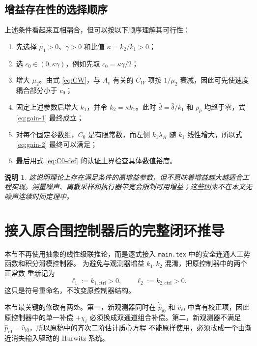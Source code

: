 \documentclass[UTF8,a4paper,12pt]{ctexart}
\newtheorem{remark}{说明}
\begin{document}
\subsection{增益存在性的选择顺序}

上述条件看起来互相耦合，但可以按以下顺序理解其可行性：
\begin{enumerate}
  \item 先选择 $\mu_1>0$、$\gamma>0$ 和比值 $\kappa=k_2/k_1>0$；
  \item 选 $c_0\in(0,\kappa\gamma)$，例如先取 $c_0=\kappa\gamma/2$；
  \item 增大 $\mu_2$。由式 \eqref{eq:CW}，与 $A_v$ 有关的 $C_W$ 项按 $1/\mu_2$ 衰减，因此可先使速度耦合部分小于 $c_0$；
  \item 固定上述参数后增大 $k_1$，并令 $k_2=\kappa k_1$。此时 $\bar d=\bar\delta/k_1$ 和 $\rho_p$ 均趋于零，式 \eqref{eq:gain-1} 最终成立；
  \item 对每个固定参数组，$C_0$ 是有限常数，而左侧 $k_1\lambda_H$ 随 $k_1$ 线性增大，所以式 \eqref{eq:gain-2} 最终可以满足；
  \item 最后用式 \eqref{eq:C0-def} 的认证上界检查具体数值裕度。
\end{enumerate}

\begin{remark}
这说明理论上存在满足条件的高增益参数，但不意味着增益越大越适合工程实现。测量噪声、离散采样和执行器带宽会限制可用增益；这些因素不在本文无噪声连续时间定理中。
\end{remark}

\section{接入原合围控制器后的完整闭环推导}

本节不再使用抽象的线性级联推论，而是逐式接入
\texttt{main.tex} 中的安全连通人工势函数和积分滑模控制器。
为避免与观测器增益 $k_1,k_2$ 混淆，把原控制器中的两个正常数
重新记为
\begin{equation}
  \ell_1:=k_{1,\mathrm{ctrl}}>0,\qquad
  \ell_2:=k_{2,\mathrm{ctrl}}>0.
\end{equation}
这只是符号重命名，不改变原控制器结构。

\begin{cwbox}
本节最关键的修改有两处。第一，新观测器同时在 $\dot{\hat p}_{i0}$
和 $\dot{\hat v}_{i0}$ 中含有校正项，因此原控制器中的单一补偿
$+\chi_i$ 必须换成双通道组合补偿。第二，新观测器不满足
$\dot{\hat p}_{i0}=\hat v_{i0}$，所以原稿中的齐次二阶估计质心方程
不能原样使用，必须改成一个由渐近消失输入驱动的 Hurwitz 系统。
\end{cwbox}
\end{document}
